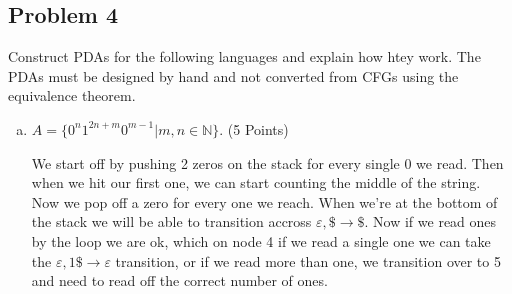 \documentclass{article}
\begin{document}
\newpage


\subsection*{Problem 4}
Construct PDAs for the following languages and explain how htey work. The PDAs must be designed by hand and
not converted from CFGs using the equivalence theorem.

\begin{enumerate}[(a)]
\item $A = \{ 0^n1^{2n+m}0^{m-1} | m,n \in \mathbb{N}\}$. (5 Points)

    
    We start off by pushing 2 zeros on the stack for every single 0 we read. Then when we hit
    our first one, we can start counting the middle of the string. Now we pop off a zero for
    every one we reach. When we're at the bottom of the stack we will be able to transition
    accross $\varepsilon, \$ \rightarrow \$$. Now if we read ones by the loop  we are ok, which
    on node 4 if we read a single one we can take the
    $\varepsilon, 1\$ \rightarrow \varepsilon$ transition, or if we read more than one, we
    transition over to 5 and need to read off the correct number of ones.


\end{enumerate}
\end{document}
